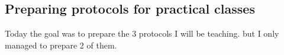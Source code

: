 \subsection{Preparing protocols for practical classes}
\label{task:20180125_cj0}

Today the goal was to prepare the 3 protocols I will be teaching. but I only managed to prepare 2 of them.